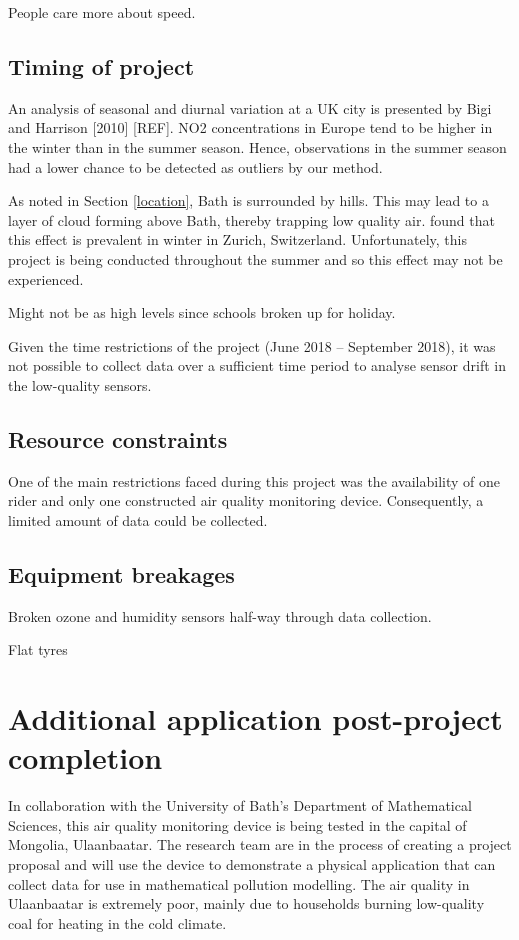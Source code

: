 \documentclass[11pt]{report}
\begin{document}
People care more about speed.

\subsection{Timing of project}

An analysis of seasonal and diurnal variation at a UK city is presented by Bigi and Harrison [2010] [REF]. NO2 concentrations in Europe tend to be higher in the winter than in the summer season. Hence, observations in the summer season had a lower chance to be detected as outliers by our method.

As noted in Section \ref{location}, Bath is surrounded by hills. This may lead to a layer of cloud forming above Bath, thereby trapping low quality air. \cite{Hasenfratz2015highresmapsTram} found that this effect is prevalent in winter in Zurich, Switzerland. Unfortunately, this project is being conducted throughout the summer and so this effect may not be experienced. 

Might not be as high levels since schools broken up for holiday.

Given the time restrictions of the project (June 2018 -- September 2018), it was not possible to collect data over a sufficient time period to analyse sensor drift in the low-quality sensors.

\subsection{Resource constraints}

One of the main restrictions faced during this project was the availability of one rider and only one constructed air quality monitoring device. Consequently, a limited amount of data could be collected.

\subsection{Equipment breakages}

Broken ozone and humidity sensors half-way through data collection.

Flat tyres


\section{Additional application post-project completion}

In collaboration with the University of Bath's Department of Mathematical Sciences, this air quality monitoring device is being tested in the capital of Mongolia, Ulaanbaatar. The research team are in the process of creating a project proposal and will use the device to demonstrate a physical application that can collect data for use in mathematical pollution modelling. The air quality in Ulaanbaatar is extremely poor, mainly due to households burning low-quality coal for heating in the cold climate.
\end{document}
